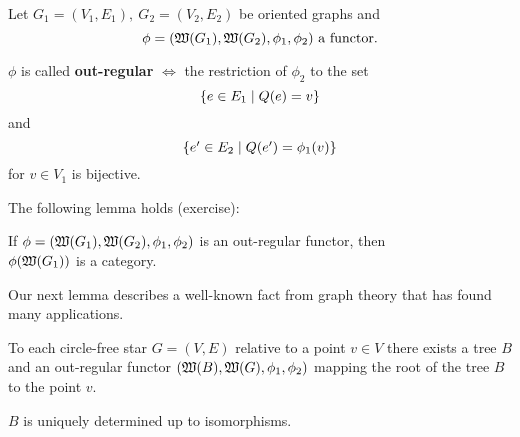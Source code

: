\bigskip
\begin{definition}
Let $G_1=(V_1,E_1),\ G_2=(V_2,E_2)$ be oriented graphs and
\[ \phi = (\mbox{$\mathfrak{W}(G_1)$}, \mbox{$\mathfrak{W}(G_2)$}, \phi_1, \phi_2)\text{ a functor.}
\]

$\phi$ is called {\bf out-regular} $\iff$ the restriction of $\phi_2$
to the set \[ \mbox{$\{e\in E_1 \mid Q(e) = v\}$} \] and \[ \mbox{$\{e' \in E_2 \mid
Q(e') = \phi_1(v)\}$} \] for $v \in V_1$ is bijective.
\end{definition}

The following lemma holds (exercise):

\begin{lemma}
If $\phi = (\mbox{$\mathfrak{W}(G_1)$}, \mbox{$\mathfrak{W}(G_2)$}, \phi_1, \phi_2)$ is an out-regular
functor, then \\ $\phi(\mbox{$\mathfrak{W}(G_1)$})$ is a category.
\end{lemma}

Our next lemma describes a well-known fact from graph theory that has found many
applications.

\begin{lemma}
To each circle-free star $G = (V, E)$ relative to a point $v \in V$ there exists
a tree $B$ and an out-regular functor $(\mbox{$\mathfrak{W}(B)$}, \mbox{$\mathfrak{W}(G)$},
\phi_1, \phi_2)$ mapping the root of the tree $B$ to the point $v$. 
\end{lemma}

$B$ is uniquely determined up to isomorphisms.
